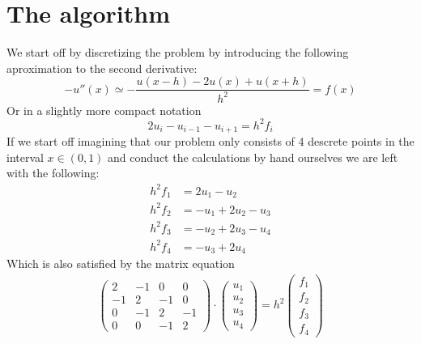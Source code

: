\documentclass[a4paper,english, 10pt, twoside]{article}
\begin{document}
\section*{The algorithm}
We start off by discretizing the problem by introducing the following aproximation to the second derivative:
$$
-u''(x) \simeq -\frac{u(x-h)-2u(x)+u(x+h)}{h^2} = f(x)
$$
Or in a slightly more compact notation
$$
2u_{i} - u_{i-1} - u_{i+1} = h^2f_i
$$
If we start off imagining that our problem only consists of 4 descrete points in the interval $x\in(0,1)$ and conduct the
calculations by hand ourselves we are left with the following:
\begin{align*}
h^2f_1 &= 2u_1 -u_2 \\
h^2f_2 &= -u_1 + 2u_2 -u_3 \\
h^2f_3 &= -u_2 + 2u_3 -u_4 \\
h^2f_4 &= -u_3 +2u_4
\end{align*}
Which is also satisfied by the matrix equation
\begin{align*}
 \left( \begin{array}{cccc} 2&-1&0&0\\
         -1&2&-1&0\\
         0&-1&2&-1\\
         0&0&-1&2 \end{array}\right)
 \cdot \left(\begin{array}{c} u_1\\u_2\\u_3\\u_4 \end{array} \right)
 =h^2\left(\begin{array}{c} f_1\\f_2\\f_3\\f_4 \end{array} \right)
\end{align*}
\end{document}
